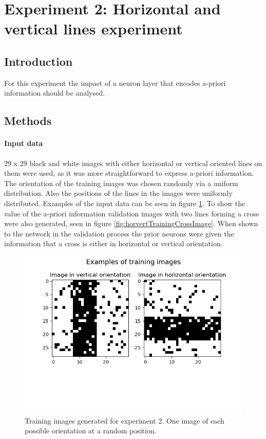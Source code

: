 \section{Experiment 2: Horizontal and vertical lines experiment}

\subsection{Introduction}

For this experiment the impact of a neuron layer that encodes a-priori information should be analysed.

\subsection{Methods}

\paragraph{Input data}
29 x 29 black and white images with either horizontal or vertical oriented lines on them were used, as it was more straightforward to express a-priori information. The orientation of the training images was chosen randomly via a uniform distribution. Also the positions of the lines in the images were uniformly distributed. Examples of the input data can be seen in figure \ref{fig:horvertImages}. To show the value of the a-priori information validation images with two lines forming a cross were also generated, seen in figure \ref{fig:horvertTrainingCrossImage}. When shown to the network in the validation process the prior neurons were given the information that a cross is either in horizontal or vertical orientation.

\begin{figure}
  \includegraphics[width=\linewidth]{figures/horvert/horvertTrainingImages.png}
  \caption{Training images generated for experiment 2. One image of each possible orientation at a random position.}
  \label{fig:horvertImages}
\end{figure}

